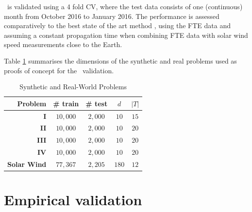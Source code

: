 \XX\ is validated using a 4 fold CV, where the test data consists of one (continuous) month from October 2016 to January 2016. The performance is assessed comparatively to the best state of the art method \citep{Poduval_2014,neuralnetsw}, using  the FTE data and assuming a constant propagation time when combining FTE data with solar wind speed measurements close to the Earth. 

Table \ref{tab:exp} summarises the dimensions of the synthetic and real problems used as proofs of concept for the \XX\ validation.
\begin{table}[htbp]
  \caption{Synthetic and Real-World Problems}\label{tab:exp_data_info}
  \centering
  \begin{tabular}{ r c c c c}
  \hline
  Problem &  \# train & \# test & $d$ & $|T|$ \\
  \hline
  \textbf{I} & $10,000$ & $2,000$  & $10$ & $15$\\
  \textbf{II} & $10,000$ & $2,000$ & $10$ & $20$\\
  \textbf{III} & $10,000$ & $2,000$ & $10$ & $20$\\
  \textbf{IV} & $10,000$ & $2,000$ & $10$ & $20$\\
  \textbf{Solar Wind} & $77,367$ & $2,205$ & $180$ & $12$\\
  \hline
  \end{tabular}
  \label{tab:exp}
\end{table}

\section{Empirical validation}\label{sec:proofconcept}

